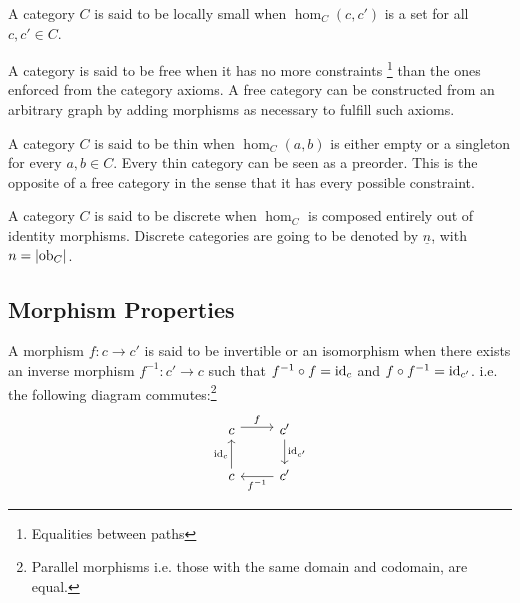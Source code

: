\begin{definition}
  A category $C$ is said to be locally small when $\hom_C(c, c')$ is a set for
  all $c,c'\in C$. \parencite{awodey:category_theory}
\end{definition}

\begin{definition}
  A category is said to be free when it has no more constraints
  \footnote{Equalities between paths} than the ones enforced from the category
  axioms. \parencite{adamek_herrlich_strecker:joy_cats} A free category can be
  constructed from an arbitrary graph by adding morphisms as necessary to
  fulfill such axioms.
\end{definition}

\begin{definition}
  A category $C$ is said to be thin when $\hom_C(a, b)$ is either empty or
  a singleton for every $a,b\in C$.
  \parencite{adamek_herrlich_strecker:joy_cats} Every thin category can be seen
  as a preorder. This is the opposite of a free category in the sense that it
  has every possible constraint.
\end{definition}

\begin{definition}
  A category $C$ is said to be discrete when $\hom_C$ is composed entirely
  out of identity morphisms. \parencite{awodey:category_theory} Discrete
  categories are going to be denoted by $\underline{n}$, with $n=|\mathrm{ob}_C|$.
\end{definition}

\subsection{Morphism Properties}

\begin{definition}
  A morphism $f: c\to c'$ is said to be invertible or an isomorphism when there
  exists an inverse morphism $f^{-1}:c'\to c$ such that $f^{-1}\circ f =
  \mathrm{id}_{c}$ and $f\circ f^{-1} = \mathrm{id}_{c'}$.
  \parencite{lane:working_mathematician} i.e. the following diagram
  commutes:\footnote{Parallel morphisms i.e. those with the same domain and
  codomain, are equal.}
  \[\begin{tikzcd}
    c & {c'} \\
    c & {c'}
    \arrow["f", shift left=1, from=1-1, to=1-2]
    \arrow["{f^{-1}}", from=2-2, to=2-1]
    \arrow["{\mathrm{id}_c}", from=2-1, to=1-1]
    \arrow["{\mathrm{id}_{c'}}", from=1-2, to=2-2]
  \end{tikzcd}\]
\end{definition}

